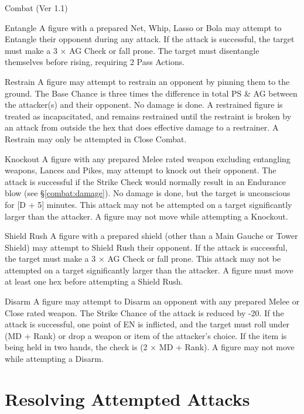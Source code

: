 \begin{Chapter}{Combat (Ver 1.1)}
\begin{Description}
\item[Entangle] A figure with a prepared Net, Whip, Lasso or Bola may
  attempt to Entangle their opponent during any attack.  If the attack
  is successful, the target must make a 3 × AG Check or fall prone.
  The target must disentangle themselves before rising, requiring 2
  Pass Actions.

\item[Restrain] A figure may attempt to restrain an opponent by
  pinning them to the ground.  The Base Chance is three times the
  difference in total PS \& AG between the attacker(s) and their
  opponent. No damage is done.  A restrained figure is treated as
  incapacitated, and remains restrained until the restraint is broken
  by an attack from outside the hex that does effective damage to a
  restrainer.  A Restrain may only be attempted in Close Combat.

\item[Knockout] A figure with any prepared Melee rated weapon
  excluding entangling weapons, Lances and Pikes, may attempt to knock
  out their opponent.  The attack is successful if the Strike Check
  would normally result in an Endurance blow (see
  \S\ref{combat:damage}).  No damage is done, but the target is
  unconscious for [D + 5] minutes.  This attack may not be attempted
  on a target significantly larger than the attacker.  A figure may
  not move while attempting a Knockout.

\item[Shield Rush] A figure with a prepared shield (other than a Main
  Gauche or Tower Shield) may attempt to Shield Rush their
  opponent. If the attack is successful, the target must make a 3 × AG
  Check or fall prone.  This attack may not be attempted on a target
  significantly larger than the attacker.  A figure must move at least
  one hex before attempting a Shield Rush.

\item[Disarm] A figure may attempt to Disarm an opponent with any
  prepared Melee or Close rated weapon. The Strike Chance of the
  attack is reduced by -20. If the attack is successful, one point of
  EN is inflicted, and the target must roll under (MD + Rank) or drop
  a weapon or item of the attacker’s choice.  If the item is being
  held in two hands, the check is (2 × MD + Rank). A figure may not
  move while attempting a Disarm.

\end{Description}

\section{Resolving Attempted Attacks}
\label{combat:resolving}


\end{Chapter}
